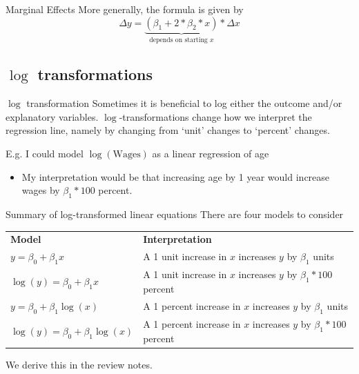 \documentclass[aspectratio=169,t,11pt,table]{beamer}
\begin{document}
\begin{frame}{Marginal Effects}
	More generally, the formula is given by 
	$$
	\Delta y = \underbrace{(\beta_1 + 2 * \beta_2 * x)}_{\text{depends on starting } x} * \Delta x 
	$$
\end{frame}


\subsection*{\texorpdfstring{$\log$}{log} transformations}

\begin{frame}{$\log$ transformation}
	Sometimes it is beneficial to log either the outcome and/or explanatory variables. $\log$-transformations change how we interpret the regression line, namely by changing from `unit' changes to `percent' changes.
	
	\pause
	\bigskip
	E.g. I could model $\log(\text{Wages})$ as a linear regression of age
	\begin{itemize}
		\item My interpretation would be that increasing age by 1 year would increase wages by $\beta_1 * 100$ percent.
	\end{itemize}
\end{frame}

\begin{frame}{Summary of log-transformed linear equations}
	There are four models to consider

	\bigskip
	\begin{tabular}{@{}
		p{} p{}
	@{}}
		\toprule
		\textbf{Model} & \textbf{Interpretation} \\

		\addlinespace[1mm]
		\midrule
		\addlinespace[1mm]

		$y = \beta_0 + \beta_1 x$ & 
		{\small A 1 unit increase in $x$ increases $y$ by $\beta_1$ units} \\

		$\log(y) = \beta_0 + \beta_1 x$ & 
		{\small A 1 unit increase in $x$ increases $y$ by $\beta_1 * 100$ percent} \\

		$y = \beta_0 + \beta_1 \log(x)$ & 
		{\small A 1 percent increase in $x$ increases $y$ by $\beta_1$ units} \\

		$\log(y) = \beta_0 + \beta_1 \log(x)$ & 
		{\small A 1 percent increase in $x$ increases $y$ by $\beta_1 * 100$ percent} \\

		\bottomrule
	\end{tabular}

	\bigskip
	We derive this in the review notes.
\end{frame}
\end{document}
